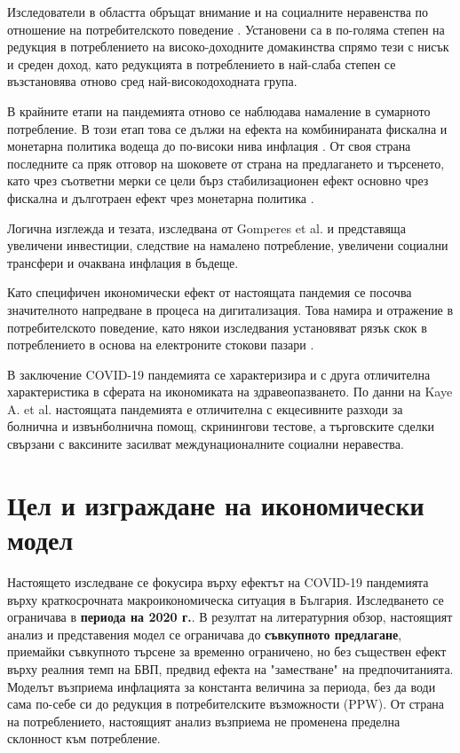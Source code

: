 \documentclass[a4paper,12pt]{article}
\begin{document}
Изследователи в областта обръщат внимание и на социалните неравенства по отношение на потребителското поведение \cite{chettyEconomicImpactsCOVID19}. Установени са в по-голяма степен на редукция в потреблението на високо-доходните домакинства спрямо тези с нисък и среден доход, като редукцията в потреблението в най-слаба степен се възстановява отново сред най-високодоходната група. 

В крайните етапи на пандемията отново се наблюдава намаление в сумарното потребление. В този етап това се дължи на ефекта на комбинираната фискална и монетарна политика водеща до по-високи нива инфлация \cite{cavallo_inflation_2020-1}. От своя страна последните са пряк отговор на шоковете от страна на предлагането и търсенето, като чрез съответни мерки се цели бърз стабилизационен ефект основно чрез фискална и дълготраен ефект чрез монетарна политика \cite{zlatinov}.

Логична изглежда и тезата, изследвана от Gomperes et al. и представяща увеличени инвестиции, следствие на намалено потребление, увеличени социални трансфери и очаквана инфлация в бъдеще\cite{gompers_venture_2020-1}. 

Като специфичен икономически ефект от настоящата пандемия се посочва значителното напредване в процеса на дигитализация. Това намира и отражение в потребителското поведение, като някои изследвания установяват рязък скок в потреблението в основа на електроните стокови пазари \cite{sharma2020changing}.

В заключение COVID-19 пандемията се характеризира и с друга отличителна характеристика в сферата на икономиката на здравеопазването. По данни на Kaye A. et al. \cite{KAYE2021293} настоящата пандемията е отличителна с екцесивните разходи за болнична и извънболнична помощ, скринингови тестове, а търговските сделки свързани с ваксините засилват междунационалните социални неравества.  

\section{Цел и изграждане на икономически модел} 
Настоящето изследване се фокусира върху ефектът на COVID-19 пандемията върху краткосрочната макроикономическа ситуация в България. Изследването се ограничава в \textbf{периода на 2020 г.}. В резултат на литературния обзор, настоящият анализ и представения модел се ограничава до \textbf{съвкупното предлагане}, приемайки съвкупното търсене за временно ограничено, но без съществен ефект върху реалния темп на БВП, предвид ефекта на "заместване" на предпочитанията. Моделът възприема инфлацията за константа величина за периода, без да води сама по-себе си до редукция в потребителските възможности (PPW). От страна на потреблението, настоящият анализ възприема не променена пределна склонност към потребление.
\end{document}
